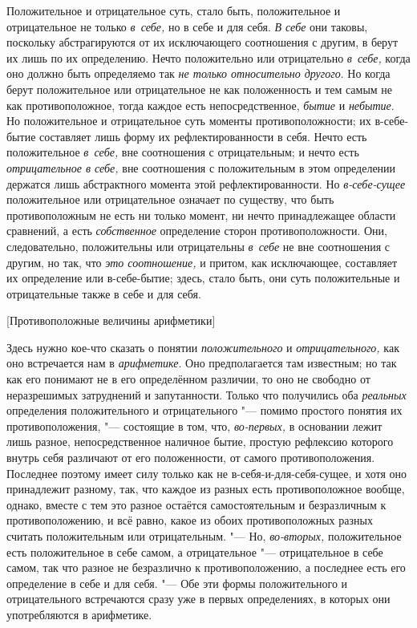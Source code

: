Положительное и отрицательное суть, стало быть, положительное и
отрицательное не только {\em в~себе,} но в себе и для
себя. {\em В себе} они таковы, поскольку абстрагируются
от их исключающего соотношения с другим, в берут их лишь по их определению.
Нечто положительно или отрицательно {\em в~себе,} когда
оно должно быть определяемо так {\em не только
относительно другого}. Но когда берут положительное или отрицательное не
как положенность и тем самым не как противоположное, тогда каждое есть
непосредственное, {\em бытие} и
{\em небытие}. Но положительное и отрицательное суть
моменты противоположности; их в-себе-бытие составляет лишь форму их
рефлектированности в себя. Нечто есть положительное
{\em в~себе,} вне соотношения с отрицательным; и нечто
есть {\em отрицательное в себе,} вне соотношения с
положительным
в этом определении держатся лишь абстрактного момента этой
рефлектированности. Но {\em в-себе-сущее} положительное
или отрицательное означает по существу, что быть противоположным не есть ни
только момент, ни нечто принадлежащее области сравнений, а есть
{\em собственное} определение сторон противоположности.
Они, следовательно, положительны или отрицательны
{\em в~себе} не вне соотношения с другим, но так, что
{\em это соотношение,} и притом, как исключающее,
составляет их определение или в-себе-бытие; здесь, стало быть, они суть
положительные и отрицательные также в себе и для себя.

%
  {[Противоположные величины арифметики]}

Здесь нужно кое-что сказать о понятии {\em положительного} и
{\em отрицательного,} как оно встречается нам в
{\em арифметике}. Оно предполагается там известным; но
так как его понимают не в его определённом различии, то оно не свободно от
неразрешимых затруднений и запутанности. Только что получились оба
{\em реальных} определения положительного и
отрицательного "--- помимо простого понятия их противоположения,
"--- состоящие в том, что, {\em во-первых,} в основании лежит лишь
разное, непосредственное наличное бытие, простую рефлексию которого внутрь
себя различают от его положенности, от самого противоположения. Последнее
поэтому имеет силу только как не в-себя-и-для-себя-сущее, и хотя оно
принадлежит разному, так, что каждое из разных есть противоположное вообще,
однако, вместе с тем это разное остаётся самостоятельным и безразличным к
противоположению, и всё равно, какое из обоих противоположных разных
считать положительным или отрицательным. "--- Но,
{\em во-вторых,} положительное есть положительное в
себе самом, а отрицательное "--- отрицательное в себе самом, так что разное не
безразлично к противоположению, а последнее есть его определение в себе и
для себя. "--- Обе эти формы положительного и отрицательного встречаются сразу
уже в первых определениях, в которых они употребляются в арифметике.

